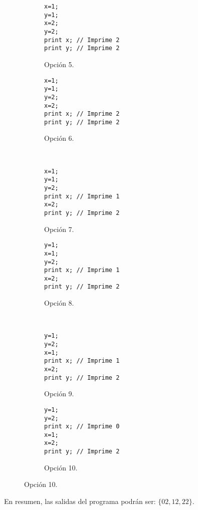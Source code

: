 \begin{ejercicio}
\begin{enumerate}
\begin{figure}[H]
\begin{subfigure}{0.3\textwidth}
        \begin{verbatim}
x=1;
y=1;
x=2;
y=2;
print x; // Imprime 2
print y; // Imprime 2
        \end{verbatim}
        \caption{Opción 5.}
    \end{subfigure}\hspace{3cm}
    \begin{subfigure}{0.3\textwidth}
        \begin{verbatim}
x=1;
y=1;
y=2;
x=2;
print x; // Imprime 2
print y; // Imprime 2
        \end{verbatim}
        \caption{Opción 6.}            
    \end{subfigure}
    \\
    \begin{subfigure}{0.3\textwidth}
        \begin{verbatim}
x=1;
y=1;
y=2;
print x; // Imprime 1
x=2;
print y; // Imprime 2
        \end{verbatim}
        \caption{Opción 7.}
    \end{subfigure}\hspace{3cm}
    \begin{subfigure}{0.3\textwidth}
        \begin{verbatim}
y=1;
x=1;
y=2;
print x; // Imprime 1
x=2;
print y; // Imprime 2
        \end{verbatim}
        \caption{Opción 8.}            
    \end{subfigure}
    \\
    \begin{subfigure}{0.3\textwidth}
        \begin{verbatim}
y=1;
y=2;
x=1;
print x; // Imprime 1
x=2;
print y; // Imprime 2
        \end{verbatim}
        \caption{Opción 9.}
    \end{subfigure}\hspace{3cm}
    \begin{subfigure}{0.3\textwidth}
        \begin{verbatim}
y=1;
y=2;
print x; // Imprime 0
x=1;
x=2;
print y; // Imprime 2
        \end{verbatim}
        \caption{Opción 10.}            
    \end{subfigure}
\end{figure}
En resumen, las salidas del programa podrán ser: $\{0 2, 1 2, 2 2\}$.


\end{enumerate}
\end{ejercicio}
